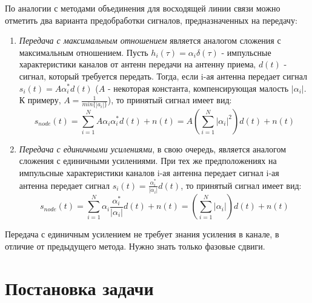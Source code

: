 \documentclass[a4paper,12pt,oneside, abstract=true]{scrartcl}
\begin{document}
По аналогии с методами объединения для восходящей линии связи можно отметить два варианта предобработки сигналов, предназначенных на передачу:

\begin{enumerate}
\item \textit{Передача с максимальным отношением} является аналогом сложения с максимальным отношением. Пусть $h_i\left(\tau\right)=\alpha_i\delta\left(\tau\right)$ - импульсные характеристики каналов от антенн передачи на антенну приема, $d\left(t\right)$ - сигнал, который требуется передать. 
Тогда, если i-ая антенна передает сигнал $s_i\left(t\right) = A\alpha^*_id\left(t\right)$ 
\newline ($A$ - некоторая константа, компенсирующая малость $|\alpha_i|$. К примеру, $A = \frac{1}{min\{|a_i|\} }$), то принятый сигнал имеет вид:
\begin{equation}
s_{node}\left(t\right)=\sum\limits_{i=1}^N A\alpha_i\alpha^*_id\left(t\right) + n\left(t\right) = A\left(\sum\limits_{i=1}^N |\alpha_i|^2\right)d\left(t\right) + n\left(t\right)
\end{equation} 
\item \textit{Передача с единичными усилениями}, в свою очередь, является аналогом сложения с единичными усилениями. 
При тех же предположениях на импульсные характеристики каналов i-ая антенна передает сигнал i-ая антенна передает сигнал $s_i\left(t\right) = \frac{\alpha^*_i}{|\alpha_i|}d\left(t\right)$, то принятый сигнал имеет вид:
\begin{equation}
s_{node}\left(t\right)=\sum\limits_{i=1}^N \alpha_i\frac{\alpha^*_i}{|\alpha_i|}d\left(t\right) + n\left(t\right) = \left(\sum\limits_{i=1}^N |\alpha_i|\right)d\left(t\right) + n\left(t\right)
\label{eq:egtsignal}
\end{equation}
\end{enumerate}
Передача с единичным усилением не требует знания усиления в канале, в отличие от предыдущего метода. Нужно знать только фазовые сдвиги.  

\clearpage

\section{Постановка задачи}
\end{document}
